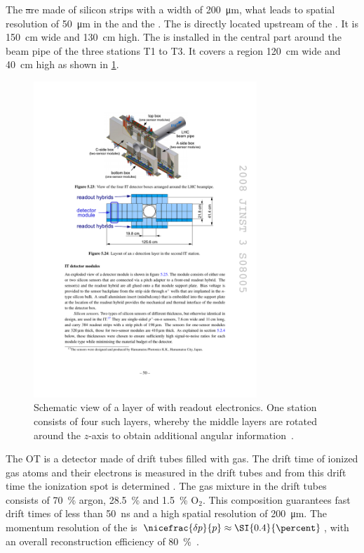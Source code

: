 The \st are made of silicon strips with a width of \SI{200}{\micro\metre}, what leads to spatial resolution of \SI{50}{\micro\metre} in the \intr and the \ttracker.
The \ttracker is directly located upstream of the \richone.
It is \SI{150}{\centi\metre} wide and \SI{130}{\centi\metre} high.
The \intr is installed in the central part around the beam pipe of the three stations T1 to T3.
It covers a region \SI{120}{\centi\metre} wide and \SI{40}{\centi\metre} high as shown in \cref{fig:InnerTracker}.
\begin{figure}[tbp]
    \centering
    \includegraphics[width=0.75\textwidth]{05lhcb/figs/IT.pdf}
    \caption{Schematic view of a layer of \intr with readout electronics.
    One station consists of four such layers, whereby the middle layers are rotated around the $z$-axis to obtain additional angular information~\cite{Alves:2008zz}.}
    \label{fig:InnerTracker}
\end{figure}

The OT is a detector made of drift tubes filled with gas.
The drift time of ionized gas atoms and their electrons is measured in the drift tubes and from this drift time the ionization spot is determined .
The gas mixture in the drift tubes consists of \SI{70}{\percent} argon, \SI{28.5}{\percent} \cotwo and \SI{1.5}{\percent} $\mathrm O_2$.
This composition guarantees fast drift times of less than \SI{50}{\nano\second} and a high spatial resolution of \SI{200}{\micro\metre}.
The momentum resolution of the \ot is $\nicefrac{\delta p}{p}\approx\SI{0.4}{\percent}$, with an overall reconstruction efficiency of \SI{80}{\percent}~\cite{Alves:2008zz}.

